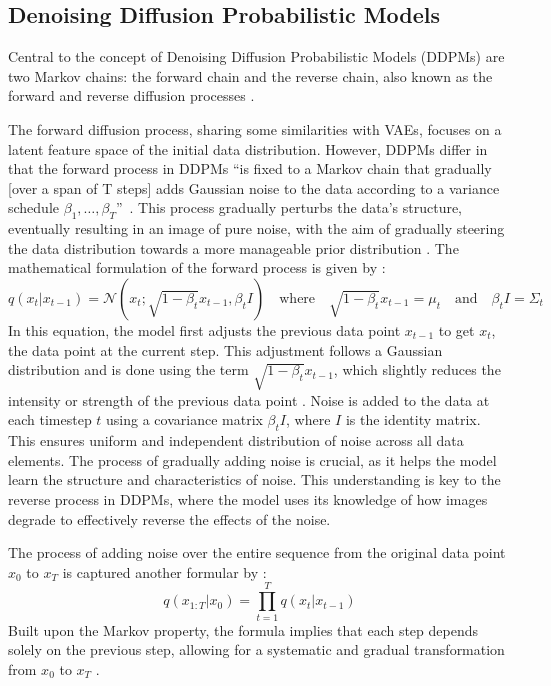 \subsection{Denoising Diffusion Probabilistic Models}\label{DDPMs}

Central to the concept of Denoising Diffusion Probabilistic Models (DDPMs) are two Markov chains: the forward chain and the reverse chain, also known as the forward and reverse diffusion processes \citep{sohlDDPM}.

The forward diffusion process, sharing some similarities with VAEs, focuses on a latent feature space of the initial data distribution. However, DDPMs differ in that the forward process in DDPMs ``is fixed to a Markov chain that gradually [over a span of T steps] adds Gaussian noise to the data according to a variance schedule \(\beta_1, \ldots, \beta_T \)''~\cite{hoDDPMs}. This process gradually perturbs the data's structure, eventually resulting in an image of pure noise, with the aim of gradually steering the data distribution towards a more manageable prior distribution \citep{yangdiffusionSummary, pooleDreamfusion}. The mathematical formulation of the forward process is given by \citeauthor{martinez2023understanding}: \[
q(x_t | x_{t-1}) = \mathcal{N}(x_t; \sqrt{1 - \beta_t}x_{t-1}, \beta_t I) \quad \text{where} \quad \sqrt{1 - \beta_t}x_{t-1} = \mu_t \quad \text{and} \quad \beta_t I = \Sigma_t
\] In this equation, the model first adjusts the previous data point \( x_{t-1} \) to get \( x_t \), the data point at the current step. This adjustment follows a Gaussian distribution and is done using the term \( \sqrt{1 - \beta_t} x_{t-1} \), which slightly reduces the intensity or strength of the previous data point \citep{sohlDDPM, hoDDPMs}. Noise is added to the data at each timestep \(t\) using a covariance matrix \(\beta_t I\), where \(I\) is the identity matrix. This ensures uniform and independent distribution of noise across all data elements. The process of gradually adding noise is crucial, as it helps the model learn the structure and characteristics of noise. This understanding is key to the reverse process in DDPMs, where the model uses its knowledge of how images degrade to effectively reverse the effects of the noise.

The process of adding noise over the entire sequence from the original data point \( x_0 \) to \( x_T \) is captured another formular by \citeauthor{martinez2023understanding}: \[q(x_{1:T} | x_0) = \prod_{t=1}^T q(x_t | x_{t-1}) \] Built upon the Markov property, the formula implies that each step depends solely on the previous step, allowing for a systematic and gradual transformation from \( x_0 \) to \( x_T \) \citep{martinez2023understanding}.

